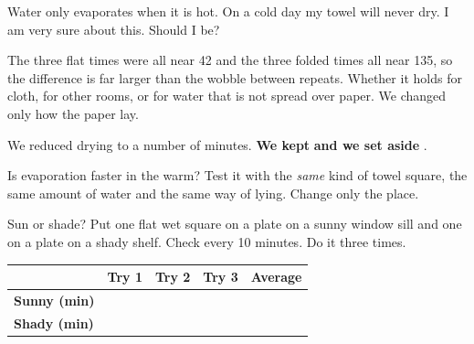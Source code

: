 \begin{center}
\end{center}

\begin{multix}[hmm]\multixbot[hmm]\tcblower
Water only evaporates when it is hot. On a cold day my towel will never dry. I am very sure about this. Should I be?
\end{multix}

{The three flat times were all near 42 and the three folded times all near 135, so the difference is far larger than the wobble between repeats.}
{Whether it holds for cloth, for other rooms, or for water that is not spread over paper. We changed only how the paper lay.}

\begin{keepbox}
We reduced drying to a number of minutes. \textbf{We kept} \wline[3.4cm] \textbf{and we set aside} \wline[3.4cm].
\end{keepbox}

\clearpage

Is evaporation faster in the warm? Test it with the \emph{same} kind of towel square, the same amount of water and the same way of lying. Change only the place.

\begin{tryit}{Sun or shade?}
Put one flat wet square on a plate on a sunny window sill and one on a plate on a shady shelf. Check every 10 minutes. Do it three times.\par\medskip
\renewcommand{\arraystretch}{1.6}
\begin{tabular}{|l|c|c|c|c|}
\hline
 & \textbf{Try 1} & \textbf{Try 2} & \textbf{Try 3} & \textbf{Average}\\ \hline
\textbf{Sunny (min)} & & & & \\ \hline
\textbf{Shady (min)} & & & & \\ \hline
\end{tabular}
\end{tryit}

